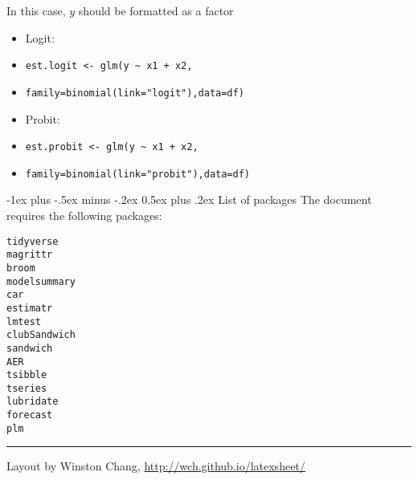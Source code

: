 \documentclass[10pt,landscape]{article}
\makeatletter
\renewcommand{\section}{\@startsection{section}{1}{0mm}%
                                {-1ex plus -.5ex minus -.2ex}%
                                {0.5ex plus .2ex}%
                                {\normalfont\large\bfseries}}
\makeatother
\begin{document}
\begin{multicols}{3}
\smallskip{}

In this case, $y$ should be formatted as a factor

\smallskip{}

\begin{itemize}
    \item Logit:
    \item[] \verb!est.logit <- glm(y ~ x1 + x2,!
    \item[] \verb!family=binomial(link="logit"),data=df)!
    \item Probit:
    \item[] \verb!est.probit <- glm(y ~ x1 + x2,!
    \item[] \verb!family=binomial(link="probit"),data=df)!
\end{itemize}





\section{List of packages}
The document requires the following packages:

\smallskip{}

\begin{multicols}{4}
\verb!tidyverse!  \\
\verb!magrittr!  \\
\verb!broom!  \\
\verb!modelsummary! \\
\verb!car!  \\
\verb!estimatr!  \\
\verb!lmtest!  \\
\verb!clubSandwich!  \\
\verb!sandwich!  \\
\verb!AER!  \\
\verb!tsibble!  \\
\verb!tseries!  \\
\verb!lubridate!  \\
\verb!forecast!  \\
\verb!plm!  \\
\end{multicols}

\rule{0.3\linewidth}{0.25pt}
\scriptsize

Layout by Winston Chang, \href{http://wch.github.io/latexsheet/}{http://wch.github.io/latexsheet/}


\end{multicols}
\end{document}
